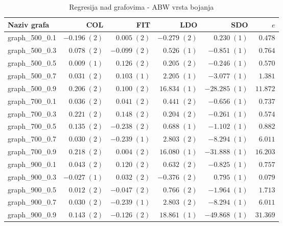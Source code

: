 \documentclass[times, utf8, diplomski, numeric]{fer}
\begin{document}
\begin{table}[!H]
	\caption{Regresija nad grafovima - ABW vrsta bojanja}
	\label{tbl:regresija-ABW}
	\centering
	\begin{tabular}{|l|r|r|r|r|r|} \hline
	Naziv grafa & COL & FIT & LDO & SDO & $e$ \\ \hline \hline
graph\_500\_0.1 & $ -0.196\; (2) $ & $ 0.005\; (2) $ & $ -0.279\; (2) $ & $ 0.230\; (1) $ & $ 0.478 $\\ \hline
graph\_500\_0.3 & $ 0.078\; (2) $ & $ -0.099\; (2) $ & $ 0.526\; (1) $ & $ -0.851\; (1) $ & $ 0.764 $\\ \hline
graph\_500\_0.5 & $ 0.009\; (1) $ & $ 0.126\; (2) $ & $ 0.205\; (2) $ & $ -0.246\; (1) $ & $ 0.570 $\\ \hline
graph\_500\_0.7 & $ 0.031\; (2) $ & $ 0.103\; (1) $ & $ 2.205\; (1) $ & $ -3.077\; (1) $ & $ 1.381 $\\ \hline
graph\_500\_0.9 & $ 0.206\; (2) $ & $ 0.100\; (2) $ & $ 16.834\; (1) $ & $ -28.285\; (1) $ & $ 11.872 $\\ \hline
graph\_700\_0.1 & $ 0.036\; (2) $ & $ 0.041\; (2) $ & $ 0.441\; (2) $ & $ -0.656\; (1) $ & $ 0.737 $\\ \hline
graph\_700\_0.3 & $ 0.221\; (2) $ & $ 0.148\; (2) $ & $ 0.204\; (2) $ & $ -0.261\; (1) $ & $ 0.574 $\\ \hline
graph\_700\_0.5 & $ 0.135\; (2) $ & $ -0.238\; (2) $ & $ 0.688\; (1) $ & $ -1.102\; (1) $ & $ 0.882 $\\ \hline
graph\_700\_0.7 & $ 0.030\; (2) $ & $ -0.239\; (1) $ & $ 2.803\; (2) $ & $ -8.294\; (1) $ & $ 6.011 $\\ \hline
graph\_700\_0.9 & $ 0.218\; (2) $ & $ 0.004\; (2) $ & $ 16.080\; (1) $ & $ -31.888\; (1) $ & $ 16.203 $\\ \hline
graph\_900\_0.1 & $ 0.043\; (2) $ & $ 0.120\; (2) $ & $ 0.632\; (2) $ & $ -0.825\; (1) $ & $ 0.757 $\\ \hline
graph\_900\_0.3 & $ -0.027\; (1) $ & $ 0.032\; (2) $ & $ -0.376\; (2) $ & $ 0.795\; (1) $ & $ 0.079 $\\ \hline
graph\_900\_0.5 & $ 0.012\; (2) $ & $ -0.047\; (2) $ & $ 0.766\; (2) $ & $ -1.964\; (1) $ & $ 1.713 $\\ \hline
graph\_900\_0.7 & $ 0.030\; (2) $ & $ -0.239\; (1) $ & $ 2.803\; (2) $ & $ -8.294\; (1) $ & $ 6.011 $\\ \hline
graph\_900\_0.9 & $ 0.143\; (2) $ & $ -0.126\; (2) $ & $ 18.861\; (1) $ & $ -49.868\; (1) $ & $ 31.369 $\\ \hline
	\end{tabular}
\end{table} 
\end{document}
